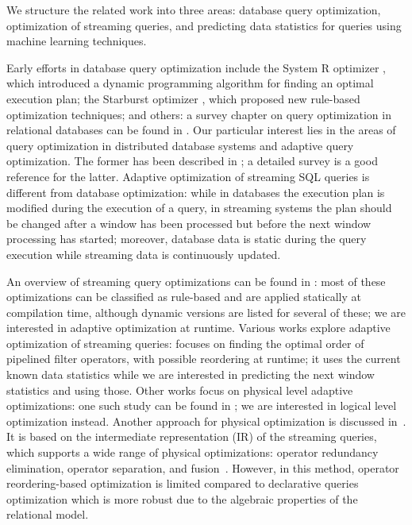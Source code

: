 \label {sec:fs-optimization-related-work}

We structure the related work into three areas: database query optimization, optimization of streaming queries, and predicting data statistics for queries using machine learning techniques.

Early efforts in database query optimization include the System R optimizer \cite{selinger1979access}, which introduced a dynamic programming algorithm for finding an optimal execution plan; the Starburst optimizer \cite{haas1989extensible}, which proposed new rule-based optimization techniques; and others: a survey chapter on query optimization in relational databases can be found in \cite{Neumann2018optimization}. Our particular interest lies in the areas of query optimization in distributed database systems and adaptive query optimization. The former has been described in \cite{kossmann2000thestate}; a detailed survey \cite{deshpande2007adaptive} is a good reference for the latter. Adaptive optimization of streaming SQL queries is different from database optimization: while in databases the execution plan is modified during the execution of a query, in streaming systems the plan should be changed after a window has been processed but before the next window processing has started; moreover, database data is static during the query execution while streaming data is continuously updated.

An overview of streaming query optimizations can be found in \cite{hirzel2014catalog}: most of these optimizations can be classified as rule-based and are applied statically at compilation time, although dynamic versions are listed for several of these; we are interested in adaptive optimization at runtime. Various works explore adaptive optimization of streaming queries: \cite{babu2004adaptive} focuses on finding the optimal order of pipelined filter operators, with possible reordering at runtime; it uses the current known data statistics while we are interested in predicting the next window statistics and using those. Other works focus on physical level adaptive optimizations: one such study can be found in \cite{grulich2020grizzly}; we are interested in logical level optimization instead. Another approach for physical optimization is discussed in~\cite{kroll2019arc}. It is based on the intermediate representation (IR) of the streaming queries, which supports a wide range of physical optimizations: operator redundancy elimination, operator separation, and fusion~\cite{hirzel2014catalog}. However, in this method, operator reordering-based optimization is limited compared to declarative queries optimization which is more robust due to the algebraic properties of the relational model. 

